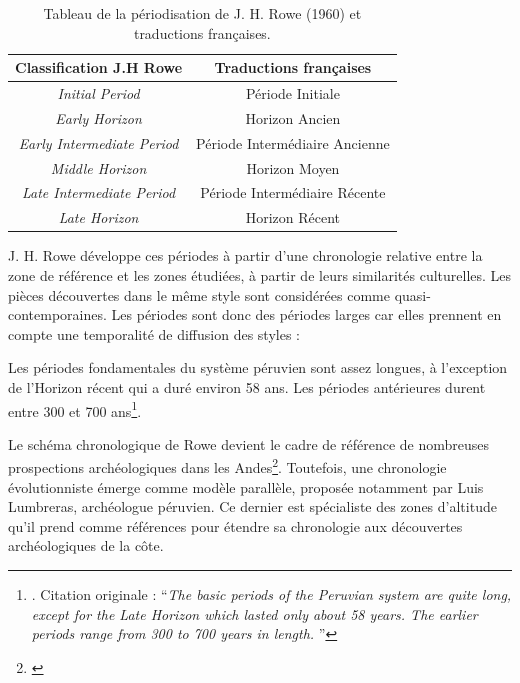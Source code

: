 \begin{table}
    \centering
    \begin{tabular}{|c|c|}
        \hline
        \textbf{Classification J.H Rowe} & \textbf{Traductions françaises} \\[1ex] \hline
         \textit{Initial Period} & Période Initiale \\[1ex] \hline
          \textit{Early Horizon} & Horizon Ancien \\ [1ex]\hline
          \textit{Early Intermediate Period} & Période Intermédiaire Ancienne \\ [1ex]\hline
          \textit{Middle Horizon} &  Horizon Moyen \\[1ex] \hline
          \textit{Late Intermediate Period} &  Période Intermédiaire Récente\\[1ex] \hline
          \textit{Late Horizon} &  Horizon Récent \\[1ex] \hline
    \end{tabular}
    \caption{Tableau de la périodisation de J. H. Rowe (1960) et traductions françaises.}
    \label{tab:periodsTrad}
\end{table}  
J. H. Rowe développe ces périodes à partir d'une chronologie relative entre la zone de référence et les zones étudiées, à partir de leurs similarités culturelles. Les pièces découvertes dans le même style sont considérées comme quasi-contemporaines. Les périodes sont donc des périodes larges car elles prennent en compte une temporalité de diffusion des styles : 
\begin{citer}
	Les périodes fondamentales du système péruvien sont assez longues, à l'exception de l'Horizon récent qui a duré environ 58 	ans. Les périodes antérieures durent entre 300 et 700 ans\footnote{\cite[p.~50]{roweStagesPeriodsArchaeological1962}. Citation originale : \textquotedblleft \textit{The basic periods of the Peruvian system are quite long, except for the Late Horizon which lasted only 	about 58 years. The earlier periods range from 300 to 700 years in length. }\textquotedblright}.
\end{citer}

\noindent Le schéma chronologique de Rowe devient le cadre de référence de nombreuses prospections archéologiques dans les Andes\footnote{\cite[p.~19]{ramonjoffrePeriodificacionArqueologiaPeruana2005}}. Toutefois, une chronologie évolutionniste émerge comme modèle parallèle, proposée notamment par Luis Lumbreras, archéologue péruvien. Ce dernier est spécialiste des zones d'altitude qu'il prend comme références pour étendre sa chronologie aux découvertes archéologiques de la côte.


